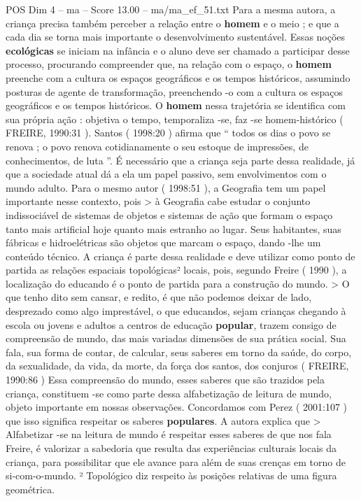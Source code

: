 \begin{textsample}{POS Dim 4 – ma – Score 13.00 – ma/ma\_ef\_51.txt}
Para a mesma autora, a criança precisa também perceber a relação entre o \textbf{homem} e o meio ; e que a cada dia se torna mais importante o desenvolvimento sustentável.
Essas noções \textbf{ecológicas} se iniciam na infância e o aluno deve ser chamado a participar desse processo, procurando compreender que, na relação com o espaço, o \textbf{homem} preenche com a cultura os espaços geográficos e os tempos históricos, assumindo posturas de agente de transformação, preenchendo -o com a cultura os espaços geográficos e os tempos históricos.
O \textbf{homem} nessa trajetória se identifica com sua própria ação : objetiva o tempo, temporaliza -se, faz -se homem-histórico ( FREIRE, 1990:31 ).
Santos ( 1998:20 ) afirma que “ todos os dias o povo se renova ; o povo renova cotidianamente o seu estoque de impressões, de conhecimentos, de luta ”.
É necessário que a criança seja parte dessa realidade, já que a sociedade atual dá a ela um papel passivo, sem envolvimentos com o mundo adulto.
Para o mesmo autor ( 1998:51 ), a Geografia tem um papel importante nesse contexto, pois > à Geografia cabe estudar o conjunto indissociável de sistemas de objetos e sistemas de ação que formam o espaço tanto mais artificial hoje quanto mais estranho ao lugar.
Seus habitantes, suas fábricas e hidroelétricas são objetos que marcam o espaço, dando -lhe um conteúdo técnico.
A criança é parte dessa realidade e deve utilizar como ponto de partida as relações espaciais topológicas² locais, pois, segundo Freire ( 1990 ), a localização do educando é o ponto de partida para a construção do mundo. > O que tenho dito sem cansar, e redito, é que não podemos deixar de lado, desprezado como algo imprestável, o que educandos, sejam crianças chegando à escola ou jovens e adultos a centros de educação \textbf{popular}, trazem consigo de compreensão de mundo, das mais variadas dimensões de sua prática social.
Sua fala, sua forma de contar, de calcular, seus saberes em torno da saúde, do corpo, da sexualidade, da vida, da morte, da força dos santos, dos conjuros ( FREIRE, 1990:86 ) Essa compreensão do mundo, esses saberes que são trazidos pela criança, constituem -se como parte dessa alfabetização de leitura de mundo, objeto importante em nossas observações.
Concordamos com Perez ( 2001:107 ) que isso significa respeitar os saberes \textbf{populares}.
A autora explica que > Alfabetizar -se na leitura de mundo é respeitar esses saberes de que nos fala Freire, é valorizar a sabedoria que resulta das experiências culturais locais da criança, para possibilitar que ele avance para além de suas crenças em torno de si-com-o-mundo. ² Topológico diz respeito às posições relativas de uma figura geométrica.

\end{textsample}
